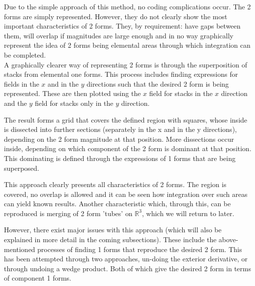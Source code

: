 \documentclass[11]{report}
\begin{document}
\noindent Due to the simple approach of this method, no coding complications occur. The 2 forms are simply represented. However, they do not clearly show the most important characteristics of 2 forms. They, by requirement: have gaps between them, will overlap if magnitudes are large enough and in no way graphically represent the idea of 2 forms being elemental areas through which integration can be completed.\\

A graphically clearer way of representing 2 forms is through the superposition of stacks from elemental one forms. This process includes finding expressions for fields in the $x$ and in the $y$ directions such that the desired 2 form is being represented. These are then plotted using the $x$ field for stacks in the $x$ direction and the $y$ field for stacks only in the $y$ direction.

\noindent The result forms a grid that covers the defined region with squares, whose inside is dissected into further sections (separately in the x and in the y directions), depending on the 2 form magnitude at that position. More dissections occur inside, depending on which component of the 2 form is dominant at that position. This dominating is defined through the expressions of 1 forms that are being superposed.

This approach clearly presents all characteristics of 2 forms. The region is covered, no overlap is allowed and it can be seen how integration over such areas can yield known results. Another characteristic which, through this, can be reproduced is merging of 2 form 'tubes' on $\mathbb{R}^{3}$, which we will return to later.

However, there exist major issues with this approach (which will also be explained in more detail in the coming subsections). These include the above-mentioned processes of finding 1 forms that reproduce the desired 2 form. This has been attempted through two approaches, un-doing the exterior derivative, or through undoing a wedge product. Both of which give the desired 2 form in terms of component 1 forms.
\end{document}

